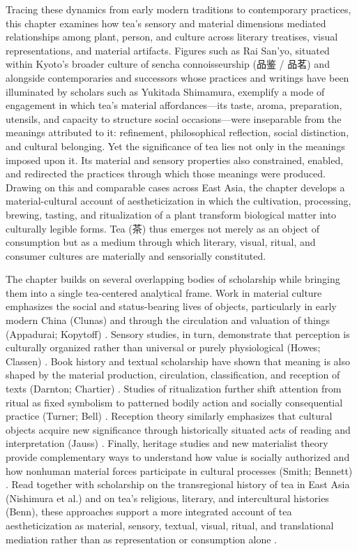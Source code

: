 \documentclass[numbers]{IntechOpen-Book}
\newcommand{\zh}[1]{{\CJKfontspec{Noto Serif CJK SC}\upshape #1}}
\begin{document}
Tracing these dynamics from early modern traditions to contemporary practices, this chapter examines how tea's sensory and material dimensions mediated relationships among plant, person, and culture across literary treatises, visual representations, and material artifacts. Figures such as Rai San'yo, situated within Kyoto's broader culture of sencha connoisseurship (\zh{品鉴 / 品茗}) and alongside contemporaries and successors whose practices and writings have been illuminated by scholars such as Yukitada Shimamura, exemplify a mode of engagement in which tea's material affordances---its taste, aroma, preparation, utensils, and capacity to structure social occasions---were inseparable from the meanings attributed to it: refinement, philosophical reflection, social distinction, and cultural belonging. Yet the significance of tea lies not only in the meanings imposed upon it. Its material and sensory properties also constrained, enabled, and redirected the practices through which those meanings were produced. Drawing on this and comparable cases across East Asia, the chapter develops a material-cultural account of aestheticization in which the cultivation, processing, brewing, tasting, and ritualization of a plant transform biological matter into culturally legible forms. Tea (\zh{茶}) thus emerges not merely as an object of consumption but as a medium through which literary, visual, ritual, and consumer cultures are materially and sensorially constituted.

The chapter builds on several overlapping bodies of scholarship while bringing them into a single tea-centered analytical frame. Work in material culture emphasizes the social and status-bearing lives of objects, particularly in early modern China (Clunas) and through the circulation and valuation of things (Appadurai; Kopytoff) \cite{appadurai,kopytoff,clunas}. Sensory studies, in turn, demonstrate that perception is culturally organized rather than universal or purely physiological (Howes; Classen) \cite{howes,classen}. Book history and textual scholarship have shown that meaning is also shaped by the material production, circulation, classification, and reception of texts (Darnton; Chartier) \cite{darnton,chartier}. Studies of ritualization further shift attention from ritual as fixed symbolism to patterned bodily action and socially consequential practice (Turner; Bell) \cite{turner,bell}. Reception theory similarly emphasizes that cultural objects acquire new significance through historically situated acts of reading and interpretation (Jauss) \cite{jauss}. Finally, heritage studies and new materialist theory provide complementary ways to understand how value is socially authorized and how nonhuman material forces participate in cultural processes (Smith; Bennett) \cite{smithheritage,bennett}. Read together with scholarship on the transregional history of tea in East Asia (Nishimura et al.) and on tea's religious, literary, and intercultural histories (Benn), these approaches support a more integrated account of tea aestheticization as material, sensory, textual, visual, ritual, and translational mediation rather than as representation or consumption alone \cite{nishimura,benn}.
\end{document}
